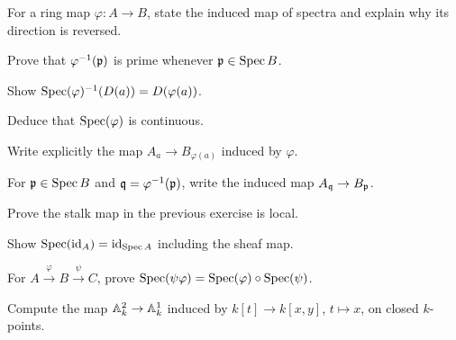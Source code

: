 \begin{exercise}\label{ex:vi19-01}
For a ring map $\varphi:A\to B$, state the induced map of spectra and explain why its direction is reversed.
\end{exercise}

\begin{exercise}\label{ex:vi19-02}
Prove that $\varphi^{-1}(\mathfrak p)$ is prime whenever $\mathfrak p\in\operatorname{Spec} B$.
\end{exercise}

\begin{exercise}\label{ex:vi19-03}
Show $\operatorname{Spec}(\varphi)^{-1}(D(a))=D(\varphi(a))$.
\end{exercise}

\begin{exercise}[Continuity]\label{ex:vi19-04}
Deduce that $\operatorname{Spec}(\varphi)$ is continuous.
\end{exercise}

\begin{exercise}\label{ex:vi19-05}
Write explicitly the map $A_a\to B_{\varphi(a)}$ induced by $\varphi$.
\end{exercise}

\begin{exercise}\label{ex:vi19-06}
For $\mathfrak p\in\operatorname{Spec} B$ and $\mathfrak q=\varphi^{-1}(\mathfrak p)$, write the induced map $A_{\mathfrak q}\to B_{\mathfrak p}$.
\end{exercise}

\begin{exercise}\label{ex:vi19-07}
Prove the stalk map in the previous exercise is local.
\end{exercise}

\begin{exercise}\label{ex:vi19-08}
Show $\operatorname{Spec}(\operatorname{id}_A)=\operatorname{id}_{\operatorname{Spec} A}$ including the sheaf map.
\end{exercise}

\begin{exercise}[Composition]\label{ex:vi19-09}
For $A\xrightarrow{\varphi}B\xrightarrow{\psi}C$, prove $\operatorname{Spec}(\psi\varphi)=\operatorname{Spec}(\varphi)\circ\operatorname{Spec}(\psi)$.
\end{exercise}

\begin{exercise}\label{ex:vi19-10}
Compute the map $\mathbb A^2_k\to\mathbb A^1_k$ induced by $k[t]\to k[x,y]$, $t\mapsto x$, on closed $k$-points.
\end{exercise}

